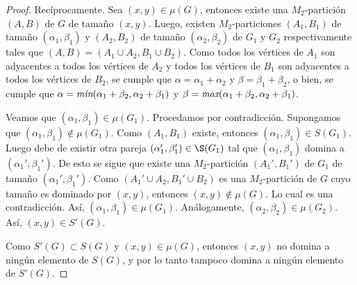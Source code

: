 \begin{proof}
Recíprocamente. Sea $(x,y)\in\mu(G)$, entonces existe una $M_2$-partición $(A,B)$ de $G$ de tamaño $(x,y)$. Luego, existen $M_2$-particiones $(A_1,B_1)$ de tamaño $(\alpha_1, \beta_1)$ y $(A_2,B_2)$ de tamaño $(\alpha_2, \beta_2)$ de $G_1$ y $G_2$ respectivamente tales que $(A,B)=(A_1\cup A_2, B_1 \cup B_2)$. Como todos los vértices de $A_1$ son adyacentes a todos los vértices de $A_2$ y todos los vértices de $B_1$ son adyacentes a todos los vértices de $B_2$, se cumple que $\alpha = \alpha_1+\alpha_2$ y $\beta = \beta_1 + \beta_2$, o bien, se cumple que $\alpha = \emph{min}(\alpha_1+\beta_2, \alpha_2+\beta_1)$ y $\beta = \emph{max}(\alpha_1+\beta_2, \alpha_2+\beta_1)$. 

Veamos que $(\alpha_1, \beta_1)\in\mu(G_1)$. Procedamos por contradicción. Supongamos que $(\alpha_1, \beta_1)\notin\mu(G_1)$. Como $(A_1,B_1)$ existe, entonces $(\alpha_1, \beta_1)\in S(G_1)$. Luego debe de existir otra pareja $(\alpha_1', \beta_1')\in\S(G_1)$ tal que $(\alpha_1, \beta_1)$ domina a $(\alpha_1', \beta_1')$. De esto se sigue que existe una $M_2$-partición $(A_1',B_1')$ de $G_1$ de tamaño $(\alpha_1', \beta_1')$. Como $(A_1'\cup A_2, B_1'\cup B_2)$ es una $M_2$-partición de $G$ cuyo tamaño es dominado por $(x,y)$, entonces $(x,y)\notin\mu(G)$. Lo cual es una contradicción. Así, $(\alpha_1, \beta_1)\in\mu(G_1)$. Análogamente, $(\alpha_2, \beta_2)\in\mu(G_2)$. Así, $(x,y)\in S'(G)$. 

Como $S'(G)\subset S(G)$ y $(x,y)\in\mu(G)$, entonces $(x,y)$ no domina a ningún elemento de $S(G)$, y por lo tanto tampoco domina a ningún elemento de $S'(G)$.

\end{proof}
